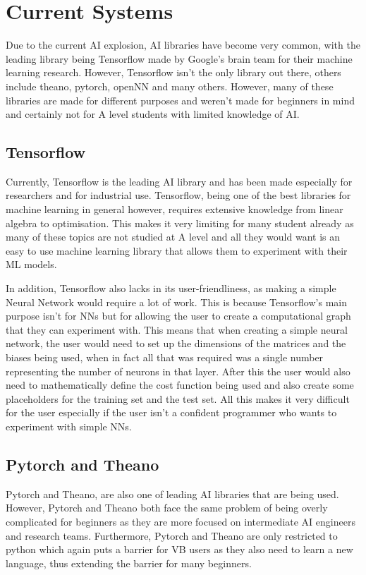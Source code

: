 \section{Current Systems}
Due to the current AI explosion, AI libraries have become very common, with the leading library being Tensorflow made by Google's brain team for their machine learning research. However, Tensorflow isn't the only library out there, others include theano, pytorch, openNN and many others. However, many of these libraries are made for different purposes and weren't made for beginners in mind and certainly not for A level students with limited knowledge of AI.

\subsection{Tensorflow}
Currently, Tensorflow is the leading AI library and has been made especially for researchers and for industrial use. Tensorflow, being one of the best libraries for machine learning in general however, requires extensive knowledge from linear algebra to optimisation. This makes it very limiting for many student already as many of these topics are not studied at A level and all they would want is an easy to use machine learning library that allows them to experiment with their ML models. 

In addition, Tensorflow also lacks in its user-friendliness, as making a simple Neural Network would require a lot of work. This is because Tensorflow's main purpose isn't for NNs but for allowing the user to create a computational graph that they can experiment with. This means that when creating a simple neural network, the user would need to set up the dimensions of the matrices and the biases being used, when in fact all that was required was a single number representing the number of neurons in that layer. After this the user would also need to mathematically define the cost function being used and also create some placeholders for the training set and the test set. All this makes it very difficult for the user especially if the user isn't a confident programmer who wants to experiment with simple NNs.

\subsection{Pytorch and Theano}
Pytorch and Theano, are also one of leading AI libraries that are being used. However, Pytorch and Theano both face the same problem of being overly complicated for beginners as they are more focused on intermediate AI engineers and research teams. Furthermore, Pytorch and Theano are only restricted to python which again puts a barrier for VB users as they also need to learn a new language, thus extending the barrier for many beginners. 

